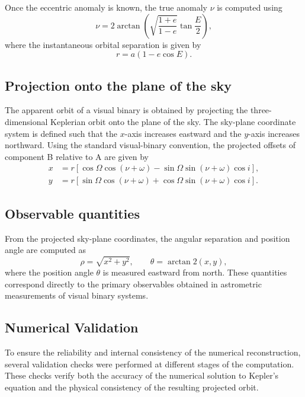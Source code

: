 \documentclass[11pt]{article}
\begin{document}
Once the eccentric anomaly is known, the true anomaly $\nu$ is computed using
\begin{equation}
\nu = 2 \arctan \left( \sqrt{\frac{1+e}{1-e}} \tan \frac{E}{2} \right),
\end{equation}
where the instantaneous orbital separation is given by
\begin{equation}
r = a(1 - e \cos E).
\end{equation}

\subsection{Projection onto the plane of the sky}

The apparent orbit of a visual binary is obtained by projecting the three-dimensional Keplerian orbit onto the plane of the sky. The sky-plane coordinate system is defined such that the $x$-axis increases eastward and the $y$-axis increases northward. Using the standard visual-binary convention, the projected offsets of component B relative to A are given by
\begin{align}
x &= r \left[ \cos \Omega \cos(\nu + \omega) - \sin \Omega \sin(\nu + \omega)\cos i \right], \\
y &= r \left[ \sin \Omega \cos(\nu + \omega) + \cos \Omega \sin(\nu + \omega)\cos i \right].
\end{align}

\subsection{Observable quantities}

From the projected sky-plane coordinates, the angular separation and position angle are computed as
\begin{equation}
\rho = \sqrt{x^2 + y^2},
\qquad
\theta = \arctan2(x, y),
\end{equation}
where the position angle $\theta$ is measured eastward from north. These quantities correspond directly to the primary observables obtained in astrometric measurements of visual binary systems.

\subsection{Numerical Validation}

To ensure the reliability and internal consistency of the numerical reconstruction, several validation checks were performed at different stages of the computation. These checks verify both the accuracy of the numerical solution to Kepler’s equation and the physical consistency of the resulting projected orbit.
\end{document}
